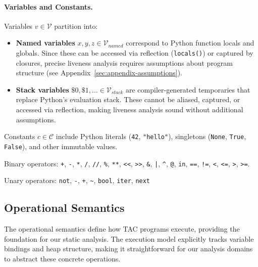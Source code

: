 \paragraph{Variables and Constants.}
Variables $v \in \mathcal{V}$ partition into:
\begin{itemize}
\item \textbf{Named variables} $x,y,z \in \mathcal{V}_{\mathit{named}}$ correspond to Python function locals and globals. Since these can be accessed via reflection (\texttt{locals()}) or captured by closures, precise liveness analysis requires assumptions about program structure (see Appendix~\ref{sec:appendix-assumptions}).
\item \textbf{Stack variables} $\$0,\$1,\ldots \in \mathcal{V}_{\mathit{stack}}$ are compiler-generated temporaries that replace Python's evaluation stack. These cannot be aliased, captured, or accessed via reflection, making liveness analysis sound without additional assumptions.
\end{itemize}

Constants $c \in \mathcal{C}$ include Python literals (\texttt{42}, \texttt{"hello"}), singletons (\texttt{None}, \texttt{True}, \texttt{False}), and other immutable values.

Binary operators: \texttt{+}, \texttt{-}, \texttt{*}, \texttt{/}, \texttt{//}, \texttt{\%}, \texttt{**}, \texttt{<<}, \texttt{>>}, \texttt{\&}, \texttt{|}, \texttt{\^}, \texttt{@}, \texttt{in}, \texttt{==}, \texttt{!=}, \texttt{<}, \texttt{<=}, \texttt{>}, \texttt{>=}.

Unary operators: \texttt{not}, \texttt{-}, \texttt{+}, \texttt{\~}, \texttt{bool}, \texttt{iter}, \texttt{next}

\subsection{Operational Semantics}

The operational semantics define how TAC programs execute, providing the foundation for our static analysis. The execution model explicitly tracks variable bindings and heap structure, making it straightforward for our analysis domains to abstract these concrete operations.

